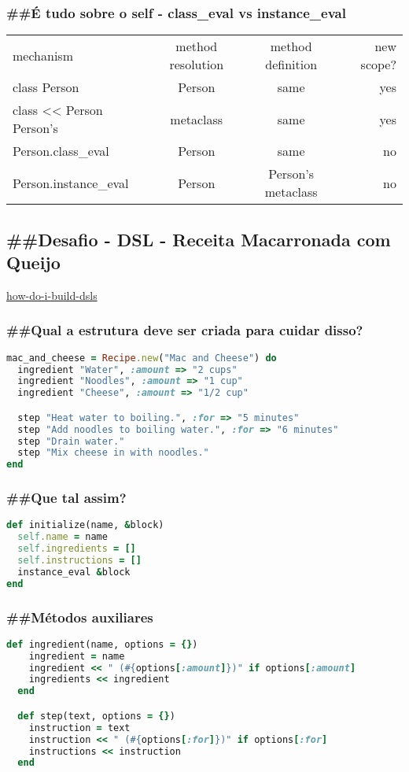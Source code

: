 \documentclass[serif,mathserif]{article}
\begin{document}
\subsubsection{\#\#É tudo sobre o self - class\_eval vs instance\_eval}
\begin{tabular}{ l | c | c |  r }
mechanism &	method resolution &	method definition &	new scope? \\
class Person &	Person &	same &	yes \\
class << Person	Person's & metaclass &	same &	yes\\
Person.class\_eval & Person & same & no\\
Person.instance\_eval & Person & Person's metaclass & no
\end{tabular}


\subsection {\#\#Desafio - DSL - Receita Macarronada com Queijo}

\href{http://rubylearning.com/blog/2010/11/30/how-do-i-build-dsls-with-yield-and-instance_eval/}{how-do-i-build-dsls}

\subsubsection{\#\#Qual a estrutura deve ser criada para cuidar disso?}
\begin{lstlisting}[language=ruby]
mac_and_cheese = Recipe.new("Mac and Cheese") do
  ingredient "Water", :amount => "2 cups"
  ingredient "Noodles", :amount => "1 cup"
  ingredient "Cheese", :amount => "1/2 cup"

  step "Heat water to boiling.", :for => "5 minutes"
  step "Add noodles to boiling water.", :for => "6 minutes"
  step "Drain water."
  step "Mix cheese in with noodles."
end
\end{lstlisting}

\subsubsection{\#\#Que tal assim?}
\begin{lstlisting}[language=ruby]
def initialize(name, &block)
  self.name = name
  self.ingredients = []
  self.instructions = []
  instance_eval &block
end
\end{lstlisting}

\subsubsection{\#\#Métodos auxiliares}
\begin{lstlisting}[language=ruby]
  def ingredient(name, options = {})
    ingredient = name
    ingredient << " (#{options[:amount]})" if options[:amount]
    ingredients << ingredient
  end

  def step(text, options = {})
    instruction = text
    instruction << " (#{options[:for]})" if options[:for]
    instructions << instruction
  end
\end{lstlisting}
\end{document}
